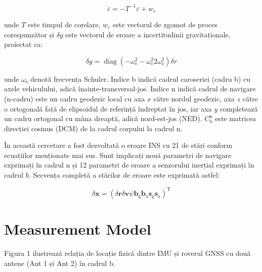 \documentclass[10pt]{report}
\begin{document}
\begin{equation}
  \dot{\varepsilon}=-T^{-1} \varepsilon+w_{\varepsilon}
\end{equation}


unde $T$ este timpul de corelare, $w_{\varepsilon}$ este vectorul de zgomot de proces corespunzător și $\delta g$ este vectorul de eroare a incertitudinii gravitaționale, proiectat ca:

\begin{equation}
  \delta g=\operatorname{diag}\left(-\omega_{\mathrm{s}}^{2}-\omega_{\mathrm{s}}^{2} 2 \omega_{\mathrm{s}}^{2}\right) \delta r
\end{equation}

unde $\omega_{\mathrm{s}}$ denotă frecvența Schuler. Indice b indică cadrul caroseriei (cadru b) cu axele vehiculului, adică înainte-transversal-jos. Indice $\mathrm{n}$ indică cadrul de navigare ($\mathrm{n}$-cadru) este un cadru geodezic local cu axa $x$ către nordul geodezic, axa $z$ către o ortogonală față de elipsoidul de referință îndreptat în jos, iar axa $y$ completează un cadru ortogonal cu mâna dreaptă, adică nord-est-jos (NED). $C_{\mathrm{b}}^{\mathrm{n}}$ este matricea direcției cosinus (DCM) de la cadrul corpului la cadrul $\mathrm{n}$.

În această cercetare a fost dezvoltată o eroare INS cu 21 de stări conform ecuațiilor menționate mai sus. Sunt implicați nouă parametri de navigare exprimați în cadrul $\mathrm{n}$ și 12 parametri de eroare a senzorului inerțial exprimați în cadrul $b$. Secvența completă a stărilor de eroare este exprimată astfel:

\begin{equation}
  \delta \boldsymbol{x}=\left(\delta \boldsymbol{r} \delta \boldsymbol{v} \psi \boldsymbol{b}_{\mathrm{g}} \boldsymbol{b}_{\mathrm{a}} \boldsymbol{s}_{\mathrm{g}} \boldsymbol{s}_{\mathrm{a}}\right)^{\mathrm{T}}
\end{equation}


\section*{Measurement Model}
Figura 1 ilustrează relația de locație fizică dintre IMU și roverul GNSS cu două antene (Ant 1 și Ant 2) în cadrul b.
\end{document}
